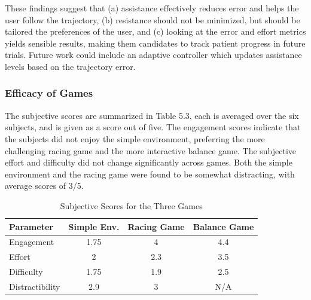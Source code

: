 \documentclass[12pt]{report}
\begin{document}

	These findings suggest that (a) assistance effectively reduces error and helps the user follow the trajectory, (b) resistance should not be minimized, but should be tailored the preferences of the user, and (c) looking at the error and effort metrics yields sensible results, making them candidates to track patient progress in future trials. Future work could include an adaptive controller which updates assistance levels based on the trajectory error. 


	
	\subsubsection{Efficacy of Games}
	
	
	The subjective scores are summarized in Table 5.3, each is averaged over the six subjects, and is given as a score out of five. The engagement scores indicate that the subjects did not enjoy the simple environment, preferring the more challenging racing game and the more interactive balance game. The subjective effort and difficulty did not change significantly across games. Both the simple environment and the racing game were found to be somewhat distracting, with average scores of 3/5. 
	
	
	\begin{table}[h] \label{tab:games}
	\centering \doublespacing
	\caption{Subjective Scores for the Three Games}
	\begin{tabular}{l c c c  }
	\toprule
	Parameter & Simple Env. & Racing Game & Balance Game \\
	\midrule
	\rowcolor{gray!10} Engagement & 1.75 & 4 & 4.4\\
	Effort & 2 & 2.3 & 3.5 \\
	\rowcolor{gray!10} Difficulty & 1.75 & 1.9 & 2.5   \\
	Distractibility & 2.9 & 3 & N/A \\
	\bottomrule
	\end{tabular}
	\end{table}	
	
\end{document}
